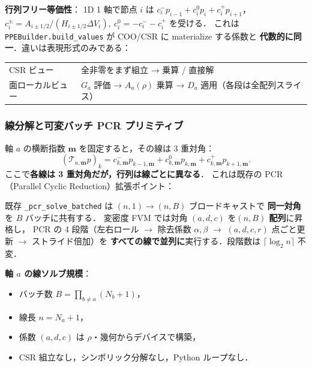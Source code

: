 \noindent\textbf{行列フリー等価性}：
1D 1 軸で節点 $i$ は
$c_i^- p_{i-1} + c_i^0 p_i + c_i^+ p_{i+1}$，
$c_i^\pm = A_{i\pm 1/2}/(H_{i\pm 1/2}\Delta V_i),\ c_i^0=-c_i^-\!-c_i^+$ を受ける．
これは \texttt{PPEBuilder.build\_values} が COO/CSR に materialize する係数と
\textbf{代数的に同一}．違いは表現形式のみである：
\begin{center}
\begin{tabular}{@{}ll@{}}
\hline
CSR ビュー & 全非零をまず組立 → 乗算 / 直接解 \\
面ローカルビュー & $G_a$ 評価 → $A_a(\rho)$ 乗算 → $D_a$ 適用（各段は全配列スライス）\\
\hline
\end{tabular}
\end{center}

\subsubsection{線分解と可変バッチ PCR プリミティブ}
\label{sec:gpu_fvm_variable_pcr}

軸 $a$ の横断指数 $\mathbf{m}$ を固定すると，その線は 3 重対角：
\begin{equation}
  (\mathcal{T}_{a,\mathbf{m}} p)_k
    = c^-_{k,\mathbf{m}} p_{k-1,\mathbf{m}}
    + c^0_{k,\mathbf{m}} p_{k,\mathbf{m}}
    + c^+_{k,\mathbf{m}} p_{k+1,\mathbf{m}}.
  \label{eq:fvm_tridiag_line}
\end{equation}
ここで\textbf{各線は 3 重対角だが，行列は線ごとに異なる}．
これは既存の PCR（Parallel Cyclic Reduction）拡張ポイント：

\begin{tcolorbox}[resultbox,title={可変バッチ PCR：$\text{PCRVar}(a,d,c,r)$}]
既存 \texttt{\_pcr\_solve\_batched} は $(n,1) \to (n,B)$ ブロードキャストで
\textbf{同一対角}を $B$ バッチに共有する．
変密度 FVM では対角 $(a,d,c)$ を\textbf{$(n,B)$ 配列}に昇格し，
PCR の 4 段階（左右ロール $\to$ 除去係数 $\alpha,\beta$ $\to$
$(a,d,c,r)$ 点ごと更新 $\to$ ストライド倍加）を
\textbf{すべての線で並列に}実行する．段階数は $\lceil\log_2 n\rceil$ 不変．
\end{tcolorbox}

\noindent\textbf{軸 $a$ の線ソルブ規模}：
\begin{itemize}[noitemsep]
  \item バッチ数 $B = \prod_{b\neq a}(N_b+1)$，
  \item 線長 $n = N_a+1$，
  \item 係数 $(a,d,c)$ は $\rho$・幾何からデバイスで構築，
  \item CSR 組立なし，シンボリック分解なし，Python ループなし．
\end{itemize}

